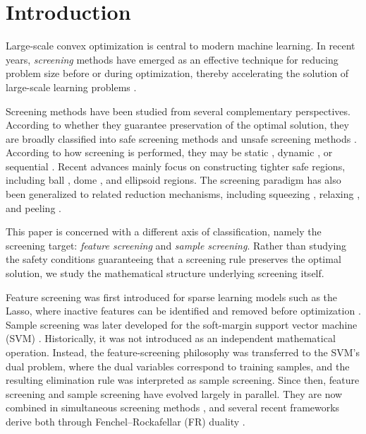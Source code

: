 \section{Introduction}
\label{sec:intro}

Large-scale convex optimization is central to modern machine learning. In recent years, \emph{screening} methods have emerged as an effective technique for reducing problem size before or during optimization, thereby accelerating the solution of large-scale learning problems \citep{elghaoui2010}.

Screening methods have been studied from several complementary perspectives. According to whether they guarantee preservation of the optimal solution, they are broadly classified into safe screening methods \citep{elghaoui2010} and unsafe screening methods \citep{tibshirani2012strong,fan2018sure}. According to how screening is
performed, they may be static
\citep{elghaoui2010}, dynamic
\citep{bonnefoy2014dynamic}, or sequential
\citep{wang2013lasso}. Recent advances mainly focus on constructing
tighter safe regions, including ball
\citep{ndiaye2017gap,tran2025one}, dome
\citep{tran2022beyond}, and ellipsoid
\citep{dai2012ellipsoid} regions. The screening paradigm has also been generalized to related reduction mechanisms, including squeezing \citep{elvira2020safe}, relaxing \citep{guyard2022screen}, and peeling \citep{guyard2023safe}.

This paper is concerned with a different axis of classification,
namely the screening target: \emph{feature screening} and \emph{sample screening}.
Rather than studying the safety conditions guaranteeing that a
screening rule preserves the optimal solution, we study the
mathematical structure underlying screening itself.

Feature screening was first introduced for sparse learning models such
as the Lasso, where inactive features can be identified and removed
before optimization \citep{elghaoui2010safe}. Sample screening was
later developed for the soft-margin support vector machine (SVM)
\citep{ogawa2014sample}. Historically, it was not introduced as an
independent mathematical operation. Instead, the feature-screening
philosophy was transferred to the SVM's dual problem, where the
dual variables correspond to training samples, and the resulting
elimination rule was interpreted as sample screening. Since then,
feature screening and sample screening have evolved largely in
parallel. They are now combined in simultaneous screening methods
\citep{shibagaki2016simultaneous}, and several recent frameworks derive
both through Fenchel--Rockafellar (FR) duality
\citep{ndiaye2017gap,yamada2021dynamic,tran2025one}.

